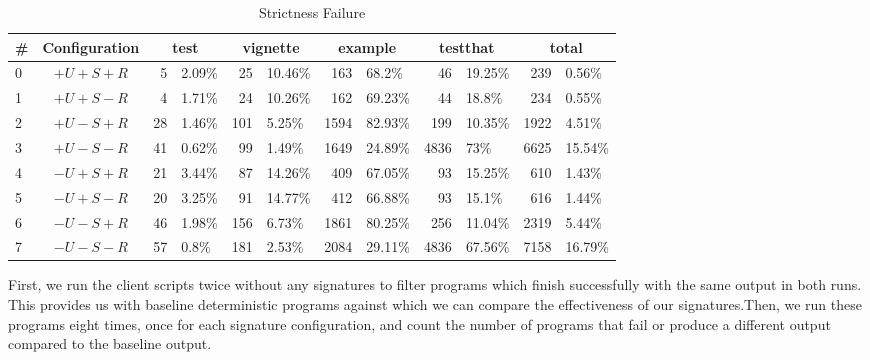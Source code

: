 \documentclass[review,nonacm,screen,acmsmall,anonymous=true]{acmart}
\begin{document}
%

\begin{table}
  \small
  \caption{Strictness Failure} \label{table:strictfail}
  \centering
  \begin{tabular}{lc|rl|rl|rl|rl|rl}
    \toprule
    \#&\textbf{Configuration}&\multicolumn{2}{c}{\textbf{test}}&\multicolumn{2}{c}{\textbf{vignette}}&\multicolumn{2}{c}{\textbf{example}}&\multicolumn{2}{c}{\textbf{testthat}}&\multicolumn{2}{c}{\textbf{total}}\\
    \midrule
    0&$+U+S+R$&5&2.09\%&25&10.46\%&163&68.2\%&46&19.25\%&239&0.56\%\\
    1&$+U+S-R$&4&1.71\%&24&10.26\%&162&69.23\%&44&18.8\%&234&0.55\%\\
    2&$+U-S+R$&28&1.46\%&101&5.25\%&1594&82.93\%&199&10.35\%&1922&4.51\%\\
    3&$+U-S-R$&41&0.62\%&99&1.49\%&1649&24.89\%&4836&73\%&6625&15.54\%\\
    4&$-U+S+R$&21&3.44\%&87&14.26\%&409&67.05\%&93&15.25\%&610&1.43\%\\
    5&$-U+S-R$&20&3.25\%&91&14.77\%&412&66.88\%&93&15.1\%&616&1.44\%\\
    6&$-U-S+R$&46&1.98\%&156&6.73\%&1861&80.25\%&256&11.04\%&2319&5.44\%\\
    7&$-U-S-R$&57&0.8\%&181&2.53\%&2084&29.11\%&4836&67.56\%&7158&16.79\%\\
    \bottomrule
  \end{tabular}
\end{table}

First, we run the client scripts twice without any signatures to filter programs
which finish successfully with the same output in both runs. This provides us
with baseline deterministic programs against which we can compare the
effectiveness of our signatures.Then, we run these programs eight times, once
for each signature configuration, and count the number of programs that fail or
produce a different output compared to the baseline output.
\end{document}

